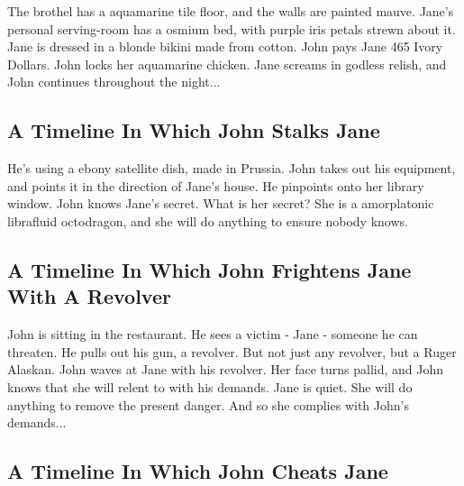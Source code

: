 \documentclass{article}
\begin{document}
The brothel has a aquamarine tile floor, and the walls are painted mauve.
Jane's personal serving{-}room has a osmium bed, with purple iris petals strewn about it.
Jane is dressed in a blonde bikini made from cotton.
John pays Jane 465 Ivory Dollars.
John locks her aquamarine chicken.
Jane screams in godless relish, and John continues throughout the night...
\subsection{A Timeline In Which John Stalks Jane}


He's using a ebony satellite dish, made in Prussia.
John takes out his equipment, and points it in the direction of Jane's house. He pinpoints onto her library window.
John knows Jane's secret. What is her secret? She is a amorplatonic librafluid octodragon, and she will do anything to ensure nobody knows.
\subsection{A Timeline In Which John Frightens Jane With A Revolver}


John is sitting in the restaurant.
He sees a victim {-} Jane {-} someone he can threaten. He pulls out his gun, a revolver.
But not just any revolver, but a Ruger Alaskan.
John waves at Jane with his revolver. Her face turns pallid, and John knows that she will relent to with his demands.
Jane is quiet. She will do anything to remove the present danger. And so she complies with John's demands...
\subsection{A Timeline In Which John Cheats Jane}
\end{document}
